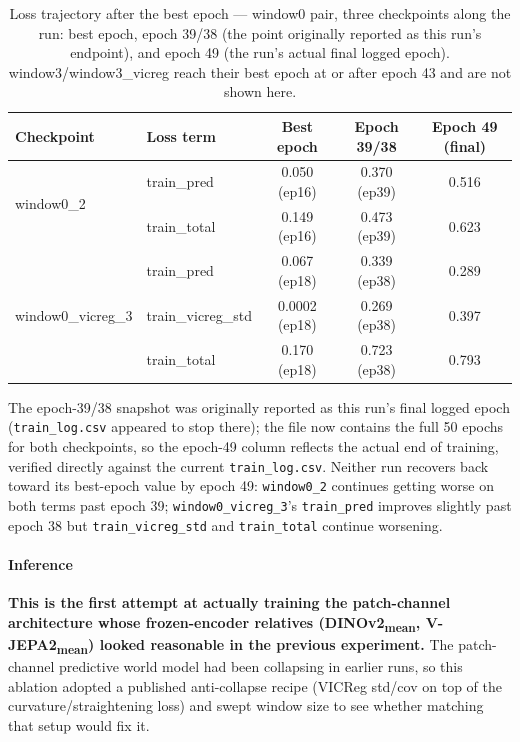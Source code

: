 \begin{table}[H]
\centering
\caption{Loss trajectory after the best epoch --- window0 pair, three checkpoints along
the run: best epoch, epoch 39/38 (the point originally reported as this run's endpoint),
and epoch 49 (the run's actual final logged epoch). window3/window3\_vicreg reach their
best epoch at or after epoch 43 and are not shown here.}
\label{tab:window-vicreg-divergence}
\footnotesize
\begin{tabular}{llccc}
\toprule
Checkpoint & Loss term & Best epoch & Epoch 39/38 & Epoch 49 (final) \\
\midrule
\multirow{2}{*}{window0\_2}
 & train\_pred & 0.050 (ep16) & 0.370 (ep39) & 0.516 \\
 & train\_total & 0.149 (ep16) & 0.473 (ep39) & 0.623 \\
\midrule
\multirow{3}{*}{window0\_vicreg\_3}
 & train\_pred & 0.067 (ep18) & 0.339 (ep38) & 0.289 \\
 & train\_vicreg\_std & 0.0002 (ep18) & 0.269 (ep38) & 0.397 \\
 & train\_total & 0.170 (ep18) & 0.723 (ep38) & 0.793 \\
\bottomrule
\end{tabular}

\vspace{0.3em}
{\footnotesize The epoch-39/38 snapshot was originally reported as this run's final
logged epoch (\texttt{train\_log.csv} appeared to stop there); the file now contains the
full 50 epochs for both checkpoints, so the epoch-49 column reflects the actual end of
training, verified directly against the current \texttt{train\_log.csv}. Neither run
recovers back toward its best-epoch value by epoch 49: \texttt{window0\_2} continues
getting worse on both terms past epoch 39; \texttt{window0\_vicreg\_3}'s
\texttt{train\_pred} improves slightly past epoch 38 but \texttt{train\_vicreg\_std} and
\texttt{train\_total} continue worsening.}
\end{table}

\paragraph{Inference}

\textbf{This is the first attempt at actually training the patch-channel architecture
whose frozen-encoder relatives (DINOv2\textsubscript{mean}, V-JEPA2\textsubscript{mean})
looked reasonable in the previous experiment.} The patch-channel predictive world model
had been collapsing in earlier runs, so this ablation adopted a published anti-collapse
recipe (VICReg std/cov on top of the curvature/straightening loss) and swept window size
to see whether matching that setup would fix it.

